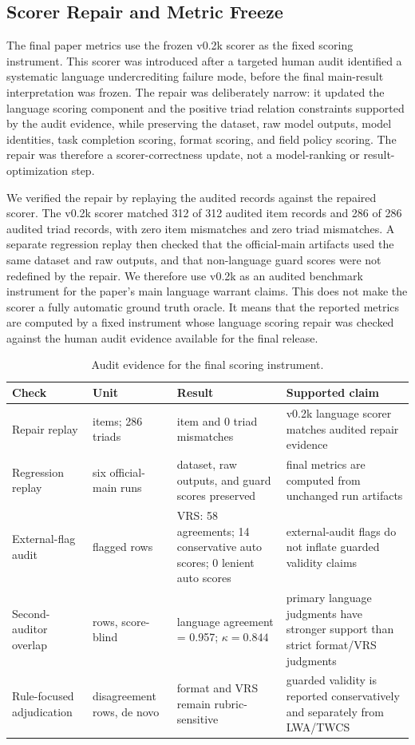 \documentclass[10pt,conference]{IEEEtran}
\begin{document}
\subsection{Scorer Repair and Metric Freeze}

The final paper metrics use the frozen v0.2k scorer as the fixed scoring instrument. This scorer was introduced after a targeted human audit identified a systematic language undercrediting failure mode, before the final main-result interpretation was frozen. The repair was deliberately narrow: it updated the language scoring component and the positive triad relation constraints supported by the audit evidence, while preserving the dataset, raw model outputs, model identities, task completion scoring, format scoring, and field policy scoring. The repair was therefore a scorer-correctness update, not a model-ranking or result-optimization step.

We verified the repair by replaying the audited records against the repaired scorer. The v0.2k scorer matched 312 of 312 audited item records and 286 of 286 audited triad records, with zero item mismatches and zero triad mismatches. A separate regression replay then checked that the official-main artifacts used the same dataset and raw outputs, and that non-language guard scores were not redefined by the repair. We therefore use v0.2k as an audited benchmark instrument for the paper's main language warrant claims. This does not make the scorer a fully automatic ground truth oracle. It means that the reported metrics are computed by a fixed instrument whose language scoring repair was checked against the human audit evidence available for the final release.

\begin{table}[t]
\centering
\caption{Audit evidence for the final scoring instrument.}
\label{tab:audit-governance-summary}
\scriptsize
\setlength{\tabcolsep}{2.6pt}
\renewcommand{\arraystretch}{1.08}
\begin{tabularx}{\columnwidth}{@{}>{\raggedright\arraybackslash}p{}>{\raggedright\arraybackslash}p{}>{\raggedright\arraybackslash}p{}>{\raggedright\arraybackslash}X@{}}
\toprule
\textbf{Check} & \textbf{Unit} & \textbf{Result} & \textbf{Supported claim} \tabularnewline
\midrule
Repair replay & 312 items; 286 triads & 0 item and 0 triad mismatches & v0.2k language scorer matches audited repair evidence \tabularnewline
Regression replay & six official-main runs & dataset, raw outputs, and guard scores preserved & final metrics are computed from unchanged run artifacts \tabularnewline
External-flag audit & 72 flagged rows & VRS: 58 agreements; 14 conservative auto scores; 0 lenient auto scores & external-audit flags do not inflate guarded validity claims \tabularnewline
Second-auditor overlap & 70 rows, score-blind & language agreement = 0.957; $\kappa=0.844$ & primary language judgments have stronger support than strict format/VRS judgments \tabularnewline
Rule-focused adjudication & 63 disagreement rows, de novo & format and VRS remain rubric-sensitive & guarded validity is reported conservatively and separately from LWA/TWCS \tabularnewline
\bottomrule
\end{tabularx}
\end{table}
\end{document}
